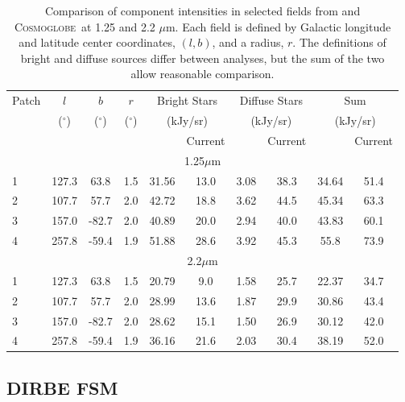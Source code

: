 \documentclass{aa}
\def\Cosmoglobe{\textsc{Cosmoglobe}}
\begin{document}
\begin{table}
    \centering
    \begin{tabular}{l c c c c c c c c c}
    \hline
    \hline
     Patch & $l$ & $b$ & $r$ & \multicolumn{2}{c}{Bright Stars} & \multicolumn{2}{c}{Diffuse Stars} & \multicolumn{2}{c}{Sum}\\ 
     & ($^{\circ}$) & ($^{\circ}$) & ($^{\circ}$) & \multicolumn{2}{c}{(kJy/sr)} & \multicolumn{2}{c}{(kJy/sr)} & \multicolumn{2}{c}{(kJy/sr)}\\
          &  & & & \cite{DIRBE2mass} & Current & \cite{DIRBE2mass} & Current  & \cite{DIRBE2mass} & Current\\
    \hline
    \hline
    \multicolumn{10}{c}{1.25$\mu$m}\\
    \hline
     1 \rule{0pt}{2ex} & 127.3 & 63.8 & 1.5 & 31.56 & 13.0 & 3.08 & 38.3 & 34.64 & 51.4\\
     2 & 107.7 & 57.7 & 2.0 & 42.72 & 18.8 & 3.62 & 44.5 & 45.34 & 63.3\\
     3 & 157.0 & -82.7 & 2.0 & 40.89 & 20.0 & 2.94 & 40.0 & 43.83 & 60.1\\
     4 & 257.8 & -59.4 & 1.9 & 51.88 & 28.6 & 3.92 & 45.3 & 55.8 & 73.9\\
     \hline
     \hline
     \multicolumn{10}{c}{2.2$\mu$m}\\
     \hline
     1 \rule{0pt}{2ex} & 127.3 & 63.8  & 1.5 & 20.79 & 9.0 & 1.58 & 25.7 & 22.37 & 34.7\\
     2 & 107.7 & 57.7 & 2.0 & 28.99 & 13.6 & 1.87 & 29.9 & 30.86 & 43.4\\
     3 & 157.0 & -82.7 & 2.0 & 28.62 & 15.1 & 1.50 & 26.9 & 30.12 & 42.0\\
     4 & 257.8 & -59.4 & 1.9 & 36.16 & 21.6 & 2.03 & 30.4 & 38.19 & 52.0\\
     \hline
    \end{tabular}
    \caption{Comparison of component intensities in selected fields from \cite{DIRBE2mass} and \Cosmoglobe\ at 1.25 and 2.2 $\mu$m. Each field is defined by Galactic longitude and latitude center coordinates, $(l,b)$, and a radius, $r$. The definitions of bright and diffuse sources differ between analyses, but the sum of the two allow reasonable comparison.}
    \label{tab:2mass}
\end{table}


\subsection{DIRBE FSM}
\end{document}
